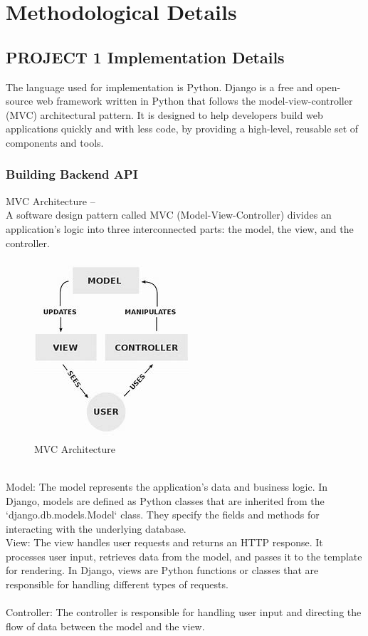 \documentclass[a4paper, 12pt]{article}
\begin{document}
\section{Methodological Details}
\subsection{PROJECT 1 Implementation Details}
\hspace*{10mm} The language used for implementation is Python. Django is a free and open-source web framework written in Python that follows the model-view-controller (MVC) architectural pattern. It is designed to help developers build web applications quickly and with less code, by providing a high-level, reusable set of components and tools. \\ 
\subsubsection{Building Backend API}
\hspace*{10mm} MVC Architecture – \\
\hspace*{10mm} A software design pattern called MVC (Model-View-Controller) divides an application's logic into three interconnected parts: the model, the view, and the controller. \\
\begin{figure}[h]
    \centering
    \includegraphics[scale=1.0]{MVC Pattern.jpg}
    \caption{MVC Architecture}
\end{figure}
\\ Model: The model represents the application's data and business logic. In Django, models are defined as Python classes that are inherited from the `django.db.models.Model` class. They specify the fields and methods for interacting with the underlying database.\\
 View: The view handles user requests and returns an HTTP response. It processes user input, retrieves data from the model, and passes it to the template for rendering. In Django, views are Python functions or classes that are responsible for handling different types of requests.\\\\
Controller: The controller is responsible for handling user input and directing the flow of data between the model and the view. \\
\end{document}
